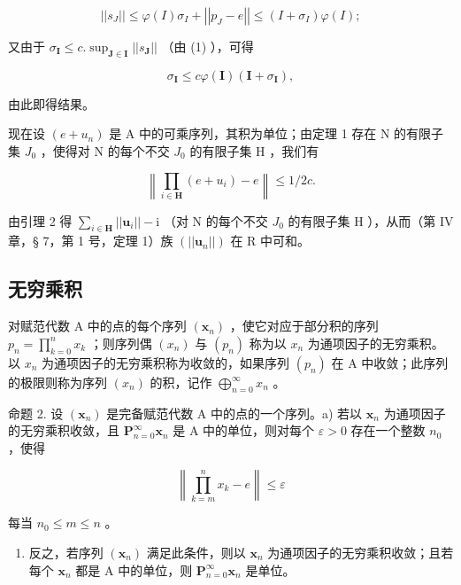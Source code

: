 \[
\left| \left| s _ {J} \right| \right| \leqslant \varphi (I) \sigma_ {I} + \left| \left| p _ {J} - e \right| \right| \leqslant (I + \sigma_ {I}) \varphi (I);
\]

又由于 \(\sigma_{\mathbf{I}} \leqslant c.\sup_{\mathbf{J} \in \mathbf{I}} ||s_{\mathbf{J}}||\) （由 (1) ），可得

\[
\sigma_ {\mathbf {I}} \leqslant c \varphi (\mathbf {I}) (\mathbf {I} + \sigma_ {\mathbf {I}}),
\]

由此即得结果。

现在设 \((e + u_{n})\) 是 A 中的可乘序列，其积为单位；由定理 1 存在 N 的有限子集 \(J_{0}\) ，使得对 N 的每个不交 \(J_{0}\) 的有限子集 H ，我们有

\[
\left\| \prod_ {i \in \mathbf {H}} (e + u _ {i}) - e \right\| \leqslant 1 / 2 c.
\]

由引理 2 得 \(\sum_{i\in\mathbf{H}}||\boldsymbol{u}_{i}||-\mathrm{i}\) （对 N 的每个不交 \(J_{0}\) 的有限子集 H ），从而（第 IV 章，§ 7，第 1 号，定理 1）族 \((||\boldsymbol{u}_{n}||)\) 在 R 中可和。

\subsection{无穷乘积}

对赋范代数 A 中的点的每个序列 \((\pmb{x}_n)\) ，使它对应于部分积的序列 \(p_n = \prod_{k=0}^{n} x_k\) ；则序列偶 \((x_{n})\) 与 \((p_{n})\) 称为以 \(x_{n}\) 为通项因子的无穷乘积。以 \(x_{n}\) 为通项因子的无穷乘积称为收敛的，如果序列 \((p_{n})\) 在 A 中收敛；此序列的极限则称为序列 \((x_{n})\) 的积，记作 \(\bigoplus_{n=0}^{\infty} x_{n}\) 。

命题 2. 设 \((\pmb{x}_n)\) 是完备赋范代数 A 中的点的一个序列。a) 若以 \(\pmb{x}_n\) 为通项因子的无穷乘积收敛，且 \(\mathbf{P}_{n=0}^{\infty}\pmb{x}_n\) 是 A 中的单位，则对每个 \(\varepsilon > 0\) 存在一个整数 \(n_0\) ，使得

\[
\left\| \prod_ {k = m} ^ {n} x _ {k} - e \right\| \leqslant \varepsilon
\]

每当 \(n_0 \leqslant m \leqslant n\) 。

\begin{enumerate}
\def\labelenumi{\alph{enumi})}
\setcounter{enumi}{1}
\tightlist
\item
  反之，若序列 \((\pmb{x}_n)\) 满足此条件，则以 \(\pmb{x}_n\) 为通项因子的无穷乘积收敛；且若每个 \(\pmb{x}_n\) 都是 A 中的单位，则 \(\mathbf{P}_{n=0}^{\infty}\pmb{x}_n\) 是单位。
\end{enumerate}


